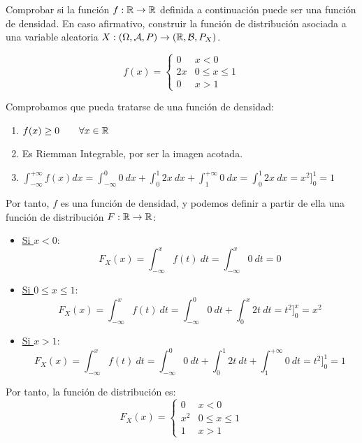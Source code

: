 \begin{ejemplo}
    Comprobar si la función $f:\mathbb R \rightarrow \mathbb R$ definida a continuación puede ser una función de densidad. En caso afirmativo, construir la función de distribución asociada a una variable aleatoria $X:(\Omega, \mathcal{A}, P) \rightarrow (\mathbb R, \mathcal{B}, P_X)$.

    $$f(x) = \left\{ \begin{array}{ll}
        0  & x < 0           \\
        2x & 0 \leq x \leq 1 \\
        0  & x > 1
    \end{array} \right.$$
      
    Comprobamos que pueda tratarse de una función de densidad:
    \begin{enumerate}
        \item $f(x) \geq 0 \qquad \forall x \in \mathbb R$

        \item Es Riemman Integrable, por ser la imagen acotada.

        \item $\displaystyle \int_{-\infty}^{+\infty} f(x) dx = \int_{-\infty}^0 0~dx+ \int_0^1 2x~dx + \int_1^{+\infty}0~dx = \int_0^1 2x~dx = x^2]_0^1=1$
    \end{enumerate}

    Por tanto, $f$ es una función de densidad, y podemos definir a partir de ella una función de distribución $F:\mathbb R \rightarrow \mathbb R$:
    \begin{itemize}
        \item \underline{Si $x<0$}:
        $$F_X(x) = \int_{-\infty}^x f(t)~dt = \int_{-\infty}^x 0~dt = 0$$

        \item \underline{Si $0 \leq x \leq 1$}:
        $$F_X(x) = \int_{-\infty}^x f(t)~dt = \int_{-\infty}^0 0~dt + \int_{0}^x 2t~dt = t^2]_0^x = x^2$$
        
        
        \item \underline{Si $x>1$}:
        $$F_X(x) = \int_{-\infty}^x f(t)~dt = \int_{-\infty}^0 0~dt + \int_{0}^1 2t~dt + \int_1^{+\infty} 0~dt = t^2]_0^1 = 1$$
    \end{itemize}

    Por tanto, la función de distribución es:
    $$F_X(x) = \left\{ \begin{array}{lc}
        0   & x < 0           \\
        x^2 & 0 \leq x \leq 1 \\
        1   & x > 1
    \end{array} \right.$$
\end{ejemplo}

